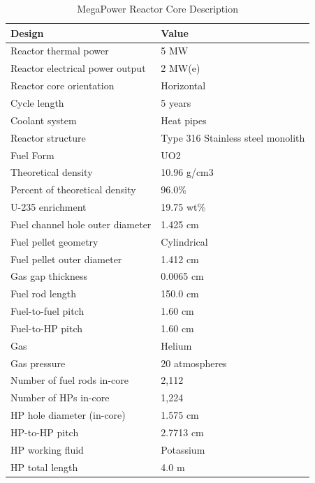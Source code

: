 \documentclass[10pt,a4paper]{article}
\begin{document}
\pagebreak
\begin{table} [hbtp]
\begin{center}

\caption{MegaPower Reactor Core Description}
\label{Megatable}
\begin{tabular}{l     l}
\hline 
Design 		&Value \\ 
\hline 
Reactor thermal power&5 MW                                             \\
Reactor electrical power output&2 MW(e)                                       \\
Reactor core orientation&Horizontal                                       \\
Cycle length&5 years                                           \\
Coolant system&Heat pipes                                      \\
Reactor structure&Type 316 Stainless steel monolith    \\
\hline 
Fuel Form&UO2                      \\
Theoretical density&10.96 g/cm3           \\
Percent of theoretical density&96.0\%                   \\
U-235 enrichment&19.75 wt\%             \\
Fuel channel hole outer diameter&1.425 cm               \\
Fuel pellet geometry&Cylindrical              \\
Fuel pellet outer diameter&1.412 cm               \\
Gas gap thickness&0.0065 cm             \\
Fuel rod length&150.0 cm               \\
Fuel-to-fuel pitch&1.60 cm                 \\
Fuel-to-HP pitch&1.60 cm                 \\
Gas&Helium                   \\
Gas pressure&20 atmospheres   \\
Number of fuel rods in-core&2,112                     \\
\hline 
Number of HPs in-core&1,224         \\
HP hole diameter (in-core)&1.575 cm    \\
HP-to-HP pitch&2.7713 cm  \\
HP working fluid&Potassium  \\
HP total length&4.0 m         \\

\end{tabular}
\end{center}
\end{table}
\end{document}
